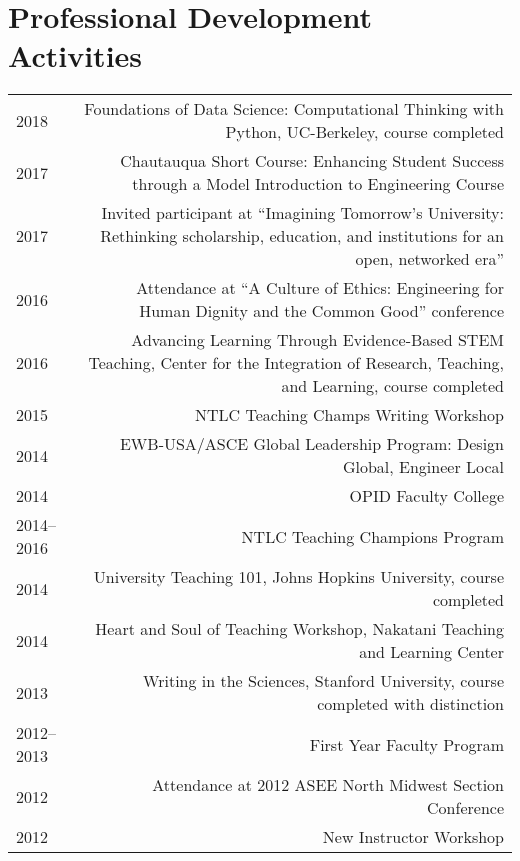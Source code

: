\section*{Professional Development Activities}
\begin{tabular}{L!{\VRule}R}
2018&Foundations of Data Science: Computational Thinking with Python, UC-Berkeley, course completed\\
2017&Chautauqua Short Course: Enhancing Student Success through a Model Introduction to Engineering Course\\
2017&Invited participant at ``Imagining Tomorrow's University: Rethinking scholarship, education, and institutions for an open, networked era''\\
2016&Attendance at ``A Culture of Ethics: Engineering for Human Dignity and the Common Good'' conference\\
2016&Advancing Learning Through Evidence-Based STEM Teaching, Center for the Integration of Research, Teaching, and Learning, course completed\\
2015&NTLC Teaching Champs Writing Workshop\\
2014&EWB-USA/ASCE Global Leadership Program: Design Global, Engineer Local\\
2014&OPID Faculty College\\
2014--2016&NTLC Teaching Champions Program\\
2014&University Teaching 101, Johns Hopkins University, course completed\\
2014&Heart and Soul of Teaching Workshop, Nakatani Teaching and Learning Center\\
2013&Writing in the Sciences, Stanford University, course completed with distinction\\
2012--2013&First Year Faculty Program\\
2012&Attendance at 2012 ASEE North Midwest Section Conference\\
2012&New Instructor Workshop\\
\end{tabular}